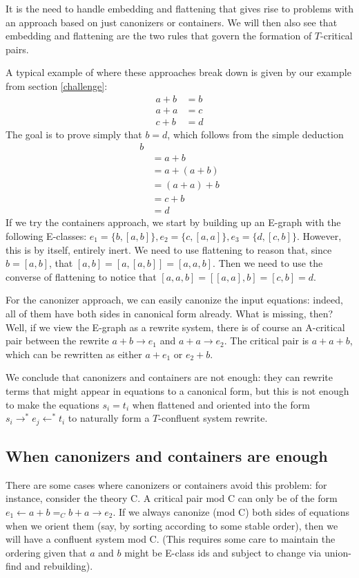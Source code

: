 \documentclass[12pt,a4paper,twoside,openright]{report}
\numberwithin{equation}{chapter}		%
\numberwithin{figure}{chapter}			%
\numberwithin{table}{chapter}			%
\theoremstyle{definition}
\theoremstyle{plain}
\begin{document}
It is the need to handle embedding and flattening that gives rise to problems with an approach based on just canonizers or containers. We will then also see that embedding and flattening are the two rules that govern the formation of $T$-critical pairs.

A typical example of where these approaches break down is given by our example from section \ref{challenge}:
\begin{align}
	a + b &= b \\
	a + a &= c \\
	c + b &= d
\end{align}
The goal is to prove simply that $b = d$, which follows from the simple deduction
\begin{align*}
	b \\ &= a + b \\&= a + (a + b) \\&= (a + a) + b \\&= c + b \\&= d
\end{align*}
If we try the containers approach, we start by building up an E-graph with the following E-classes:
$e_1 = \{b, [a, b]\}, e_2 = \{c, [a, a]\}, e_3 = \{d, [c, b]\}$.
However, this is by itself, entirely inert. We need to use flattening to reason that, since $b = [a, b]$, that $[a, b] = [a, [a, b]] = [a, a, b]$. Then we need to use the converse of flattening to notice that $[a, a, b] = [[a, a], b] = [c, b] = d$.

For the canonizer approach, we can easily canonize the input equations: indeed, all of them have both sides in canonical form already. What is missing, then? Well, if we view the E-graph as a rewrite system, there is of course an A-critical pair between the rewrite $a + b \rightarrow e_1$ and $a + a \rightarrow e_2$. The critical pair is $a + a + b$, which can be rewritten as either $a + e_1$ or $e_2 + b$. 

We conclude that canonizers and containers are not enough: they can rewrite terms that might appear in equations to a canonical form, but this is not enough to make the equations $s_i = t_i$ when flattened and oriented into the form $s_i \rightarrow^* e_j \leftarrow^* t_i$ to naturally form a $T$-confluent system rewrite.

\subsection{When canonizers and containers are enough}
There are some cases where canonizers or containers avoid this problem: for instance, consider the theory C. A critical pair mod C can only be of the form $e_1 \leftarrow a + b =_C b + a \rightarrow e_2$. If we always canonize (mod C) both sides of equations when we orient them (say, by sorting according to some stable order), then we will have a confluent system mod C. (This requires some care to maintain the ordering given that $a$ and $b$ might be E-class ids and subject to change via union-find and rebuilding).
\end{document}
